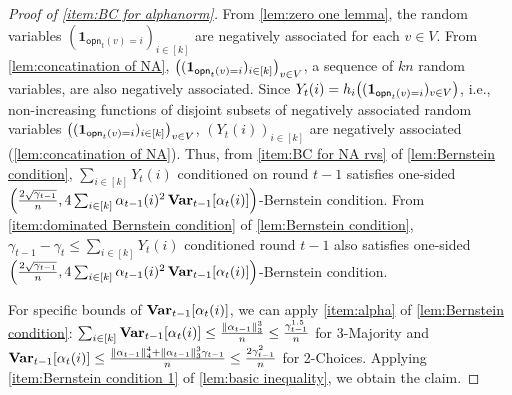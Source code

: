 \documentclass[letterpaper,11pt]{article}
\DeclarePairedDelimiter{\sbra}{\lbrack}{\rbrack} %
\newcommand{\indicator}{\mathbf{1}}
\DeclareMathOperator*{\Var}{\mathbf{Var}}
\newcommand{\alphanorm}{\gamma}
\newcommand{\opinion}{\mathsf{opn}}
\begin{document}
\begin{proof}[Proof of \cref{item:BC for alphanorm}]
    From \cref{lem:zero one lemma}, the random variables $(\indicator_{\opinion_t(v)=i})_{i\in [k]}$ are negatively associated for each $v\in V$.
    From \cref{lem:concatination of NA}, $\qty((\indicator_{\opinion_t(v)=i})_{i\in [k]})_{v\in V}$, a sequence of $kn$ random variables, are also negatively associated.
    Since $Y_t(i)=h_i\qty((\indicator_{\opinion_t(v)=i})_{v\in V})$, i.e., non-increasing functions of disjoint subsets of negatively associated random variables $\qty((\indicator_{\opinion_t(v)=i})_{i\in [k]})_{v\in V}$, $(Y_t(i))_{i\in [k]}$ are negatively associated (\cref{lem:concatination of NA}).    
    Thus, from \cref{item:BC for NA rvs} of \cref{lem:Bernstein condition}, $\sum_{i\in [k]}Y_t(i)$ conditioned on round $t-1$ satisfies 
    one-sided $\qty(\frac{2\sqrt{\alphanorm_{t-1}}}{n}, 4\sum_{i\in [k]}\alpha_{t-1}(i)^2\Var_{t-1}[\alpha_t(i)])$-Bernstein condition.
    From \cref{item:dominated Bernstein condition} of \cref{lem:Bernstein condition}, $\alphanorm_{t-1}-\alphanorm_t\leq \sum_{i\in [k]}Y_t(i)$ conditioned round $t-1$ also satisfies 
    one-sided $\qty(\frac{2\sqrt{\alphanorm_{t-1}}}{n},4\sum_{i\in [k]}\alpha_{t-1}(i)^2\Var_{t-1}[\alpha_t(i)])$-Bernstein condition.
    
    For specific bounds of $\Var_{t-1}\sbra*{\alpha_{t}(i)}$, we can apply \cref{item:alpha} of \cref{lem:Bernstein condition}: 
    $
      \sum_{i\in [k]}\Var_{t-1}\sbra*{\alpha_{t}(i)}\leq \frac{\|\alpha_{t-1}\|_3^3}{n}\leq \frac{\alphanorm_{t-1}^{1.5}}{n}
    $
    for 3-Majority and 
    $\Var_{t-1}\sbra*{\alpha_{t}(i)}\leq \frac{\|\alpha_{t-1}\|_4^4 + \|\alpha_{t-1}\|_3^3 \alphanorm_{t-1}}{n}
    \leq \frac{2\alphanorm_{t-1}^2}{n}$ for 2-Choices.
    Applying \cref{item:Bernstein condition 1} of \cref{lem:basic inequality}, we obtain the claim.
  \end{proof}
\end{document}
